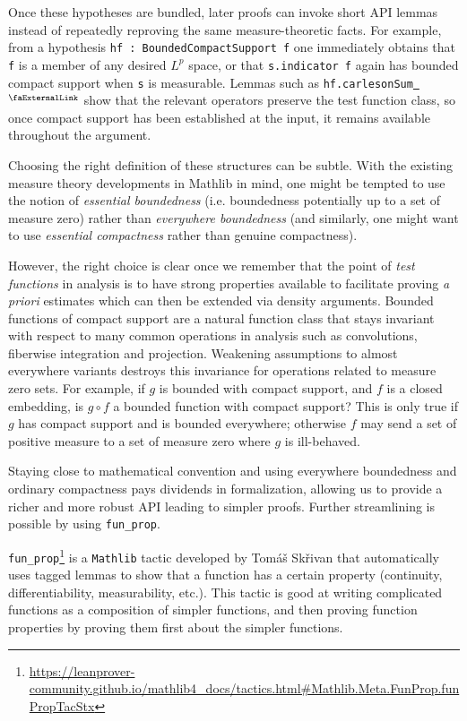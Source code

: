 \documentclass[12pt]{amsart}
\newcommand{\lean}[1]{\lstinline{#1}}
\newcommand{\mathlib}{\texttt{Mathlib}\xspace}
\newcommand{\extlink}{~\ensuremath{{}^\text{\faExternalLink}}}
\theoremstyle{definition}
\theoremstyle{plain}
\begin{document}
Once these hypotheses are bundled, later proofs can invoke short API lemmas instead of repeatedly
reproving the same measure-theoretic facts. For example, from a hypothesis
\lean{hf : BoundedCompactSupport f} one immediately obtains that \lean{f} is a member of
any desired $L^p$ space, %
or that \lean{s.indicator f} again has bounded compact support when \lean{s} is measurable.
Lemmas such as \lean{hf.carlesonSum}\href{https://github.com/fpvandoorn/carleson/blob/f2f614db47f1a30e3fceaa9c2e1f99ff356dd577/Carleson/Operators.lean#L164}{\extlink} show that the relevant
operators preserve the test function class, so once compact support has been established at the input, it remains available throughout the argument.

Choosing the right definition of these structures can be subtle.
With the existing measure theory developments in Mathlib in mind,
one might be tempted to use the notion of {\em essential boundedness}
(i.e. boundedness potentially up to a set of measure zero)
rather than {\em everywhere boundedness} (and similarly, one might want to use {\em essential compactness}
rather than genuine compactness).

However, the right choice is clear once we remember that the point of {\em test functions} in analysis is
to have strong properties available to facilitate proving {\em a priori} estimates
which can then be extended via density arguments.
Bounded functions of compact support are a natural function class that stays invariant with respect
to many common operations in analysis such as convolutions, fiberwise integration and projection.
Weakening assumptions to almost everywhere variants destroys this invariance for operations
related to measure zero sets.
For example, if $g$ is bounded with compact support, and $f$ is a closed embedding,
is $g\circ f$ a bounded function with compact support?
This is only true if $g$ has compact support and is bounded everywhere;
otherwise $f$ may send a set of positive measure to a set of measure zero where $g$ is ill-behaved.

Staying close to mathematical convention and using everywhere boundedness and ordinary compactness
pays dividends in formalization, allowing us to provide a richer and more robust API leading
to simpler proofs.
Further streamlining is possible by using \lean{fun_prop}.

\lean{fun_prop}\footnote{\url{https://leanprover-community.github.io/mathlib4_docs/tactics.html\#Mathlib.Meta.FunProp.funPropTacStx}}
is a \mathlib tactic developed by Tomáš Skřivan
that automatically uses tagged lemmas to show that a function has a certain property
(continuity, differentiability, measurability, etc.).
This tactic is good at writing complicated functions as a composition of simpler functions,
and then proving function properties by proving them first about the simpler functions.
\end{document}
